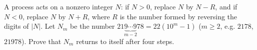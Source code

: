 A process acts on a nonzero integer $N$: if $N>0$, replace $N$ by $N-R$, and if $N<0$, replace $N$ by $N+R$, where $R$ is the number formed by reversing the digits of $|N|$. Let $N_m$ be the number $21\underbrace{9\cdots9}_{m-2}78=22\left(10^m-1\right)$ ($m\ge2$, e.g. $2178$, $21978$). Prove that $N_m$ returns to itself after four steps.

